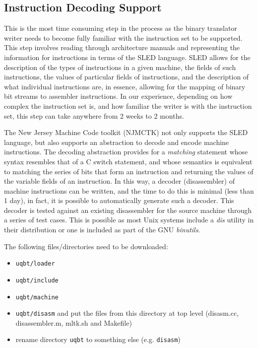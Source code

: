 \subsection{Instruction Decoding Support}
	This is the most time consuming step in the process as the 
	binary translator writer needs to become fully familiar with 
	the instruction set to be supported.  This step involves 
	reading through architecture manuals and representing the 
	information for instructions in terms of the SLED language. 
	SLED allows for the description of the types of instructions 
	in a given machine, the fields of such instructions, the 
	values of particular fields of instructions, and the description
	of what individual instructions are, in essence, allowing for
	the mapping of binary bit streams to assembler instructions. 
	In our experience, depending on how complex the instruction 
	set is, and how familiar the writer is with the instruction 
	set, this step can take anywhere from 2 weeks to 2 months. 

    The New Jersey Machine Code toolkit (NJMCTK) not only supports 
	the SLED language, but also supports an abstraction to decode and 
	encode machine instructions.  The decoding abstraction provides for
    a \emph{matching} statement whose syntax resembles that of
    a C switch statement, and whose semantics is equivalent to
    matching the series of bits that form an instruction and
    returning the values of the variable fields of an instruction.
    In this way, a decoder (disassembler) of machine instructions 
	can be written, and the time to do this is minimal (less than 
	1 day), in fact, it is possible to automatically generate such
	a decoder.  This decoder is tested against an existing 
	disassembler for the source machine through a series of test 
	cases.  This is possible as most Unix systems include a \emph{dis} 
	utility in their distribution or one is included as part of 
	the GNU \emph{binutils}.

The following files/directories need to be downloaded: 
\begin{itemize}
\item \texttt{uqbt/loader}
\item \texttt{uqbt/include}
\item \texttt{uqbt/machine}
\item \texttt{uqbt/disasm} and put the files 
	from this directory at top level (disasm.cc, disassembler.m, mltk.sh 
	and Makefile)
\item rename directory \texttt{uqbt} to something else (e.g.
	\texttt{disasm})
\end{itemize}

